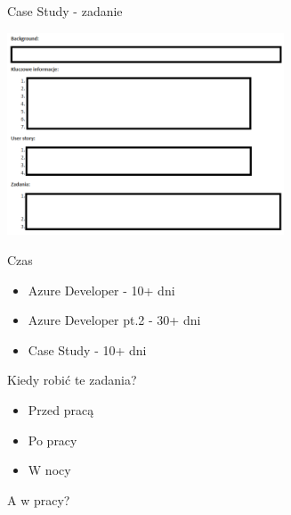 \documentclass{beamer}
\begin{document}
\begin{frame}{Case Study - zadanie}
	\begin{center}
		\includegraphics[height=6cm]{cs_zadanie.PNG}
	\end{center}
\end{frame}

\begin{frame}{Czas}
	\begin{huge}
		\begin{itemize}
			\item Azure Developer - 10+ dni
			\item Azure Developer pt.2 - 30+ dni
			\item Case Study - 10+ dni
		\end{itemize}
	\end{huge}
\end{frame}

\begin{frame}{}
	\begin{center}
		\Huge{Kiedy robić te zadania?}
	\end{center}
\end{frame}

\begin{frame}{}
	\begin{huge}
		\begin{itemize}
			\item Przed pracą
			\item Po pracy
			\item W nocy
		\end{itemize}
	\end{huge}
\end{frame}

\begin{frame}{}
	\begin{center}
		\Huge{A w pracy?}
	\end{center}
\end{frame}
\end{document}
